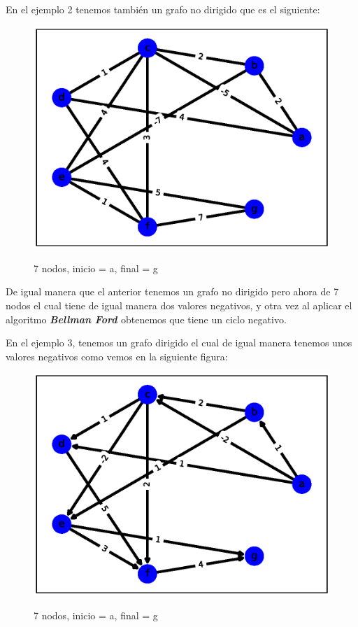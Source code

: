 \documentclass{report}
\newcommand{\bell}{{\bfseries {\textit{Bellman Ford }}}}
\begin{document}
En el ejemplo 2 tenemos también un grafo no dirigido que es el siguiente:

\begin{figure}[h!t]
    \centering
    \includegraphics[scale = 0.5]{ejemplo5.eps}
    \label{figura5}
    \caption{7 nodos, inicio = a, final = g}
\end{figure}

De igual manera que el anterior tenemos un grafo no dirigido pero ahora de 7 nodos el cual tiene de igual manera dos valores negativos, y otra vez al aplicar el algoritmo \bell obtenemos que tiene un ciclo negativo.

En el ejemplo 3, tenemos un grafo dirigido el cual de igual manera tenemos unos valores negativos como vemos en la siguiente figura:

\newpage
\begin{figure}[h!t]
    \centering
    \includegraphics[scale = 0.5]{ejemplo6.eps}
    \label{figura6}
    \caption{7 nodos, inicio = a, final = g}
\end{figure}
\end{document}
